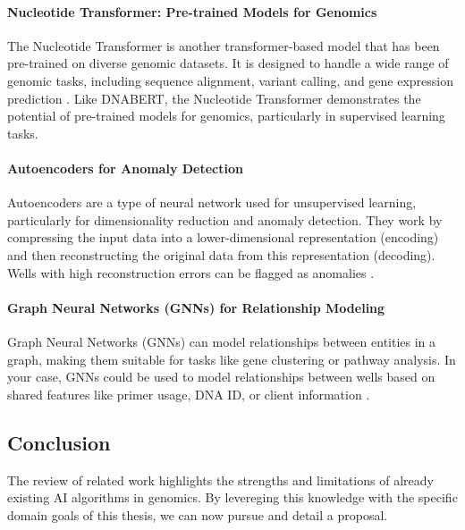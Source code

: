 \paragraph{Nucleotide Transformer: Pre-trained Models for Genomics}
The Nucleotide Transformer is another transformer-based model that has been pre-trained on diverse genomic datasets. It is designed to handle a wide range of genomic tasks, including sequence alignment, variant calling, and gene expression prediction \cite{dalla2023nucleotide}. Like DNABERT, the Nucleotide Transformer demonstrates the potential of pre-trained models for genomics, particularly in supervised learning tasks.

\paragraph{Autoencoders for Anomaly Detection}
Autoencoders are a type of neural network used for unsupervised learning, particularly for dimensionality reduction and anomaly detection. They work by compressing the input data into a lower-dimensional representation (encoding) and then reconstructing the original data from this representation (decoding). Wells with high reconstruction errors can be flagged as anomalies \cite{kingma2013autoencoding}.

\paragraph{Graph Neural Networks (GNNs) for Relationship Modeling}
Graph Neural Networks (GNNs) can model relationships between entities in a graph, making them suitable for tasks like gene clustering or pathway analysis. In your case, GNNs could be used to model relationships between wells based on shared features like primer usage, DNA ID, or client information \cite{kipf2016semi}.
\subsection{Conclusion}
The review of related work highlights the strengths and limitations of already existing AI algorithms in genomics. By levereging this knowledge with the specific domain goals of this thesis, we can now pursue and detail a proposal.